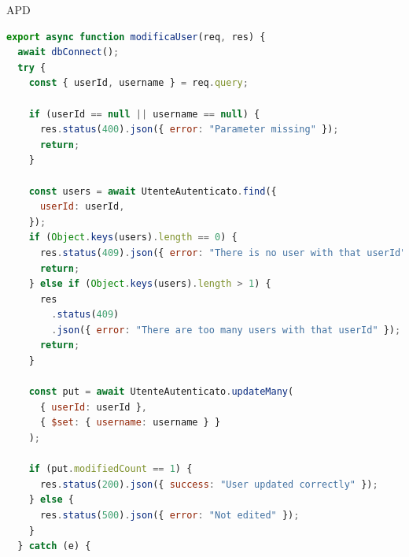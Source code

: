 \begin{listaPersonale} {APD}
\begin{listaPersonale2}[APD]{}

                \begin{lstlisting}[language=JavaScript]
export async function modificaUser(req, res) {
  await dbConnect();
  try {
    const { userId, username } = req.query;

    if (userId == null || username == null) {
      res.status(400).json({ error: "Parameter missing" });
      return;
    }

    const users = await UtenteAutenticato.find({
      userId: userId,
    });
    if (Object.keys(users).length == 0) {
      res.status(409).json({ error: "There is no user with that userId" });
      return;
    } else if (Object.keys(users).length > 1) {
      res
        .status(409)
        .json({ error: "There are too many users with that userId" });
      return;
    }

    const put = await UtenteAutenticato.updateMany(
      { userId: userId },
      { $set: { username: username } }
    );

    if (put.modifiedCount == 1) {
      res.status(200).json({ success: "User updated correctly" });
    } else {
      res.status(500).json({ error: "Not edited" });
    }
  } catch (e) {
    

\end{lstlisting}
\end{listaPersonale2}
\end{listaPersonale}
